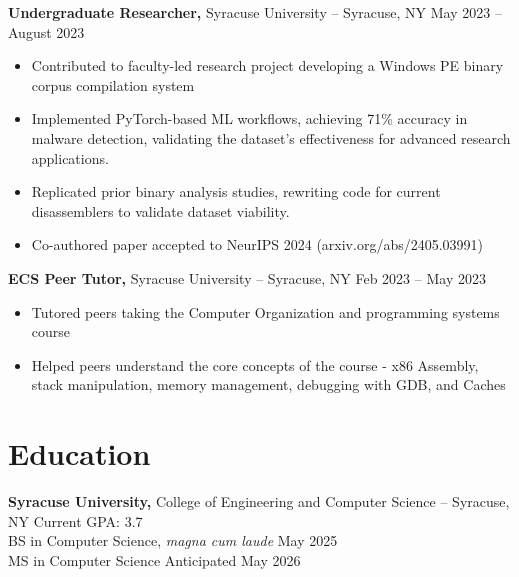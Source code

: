 \vspace{-6pt}
\textbf{Undergraduate Researcher,} {Syracuse University} -- Syracuse, NY \hfill May 2023 -- August 2023 \\
\vspace{-9pt}
\begin{itemize}
	\item Contributed to faculty-led research project developing a Windows PE binary corpus compilation system
	\item Implemented PyTorch-based ML workflows, achieving 71\% accuracy in malware detection, validating the dataset's effectiveness for advanced research applications.
	\item Replicated prior binary analysis studies, rewriting code for current disassemblers to validate dataset viability.
	\item Co-authored paper accepted to NeurIPS 2024 (arxiv.org/abs/2405.03991)
\end{itemize}
\vspace{-6pt}
\textbf{ECS Peer Tutor,} {Syracuse University} -- Syracuse, NY \hfill Feb 2023 -- May 2023 \\
\vspace{-9pt}
\begin{itemize}
	\item Tutored peers taking the Computer Organization and programming systems course
	\item Helped peers understand the core concepts of the course - x86 Assembly, stack manipulation, memory management, debugging with GDB, and Caches
\end{itemize}

\vspace{-25pt}


\section*{Education}
\textbf{Syracuse University, } {College of Engineering and Computer Science} -- Syracuse, NY \hfill Current GPA: 3.7 \\
\hspace{2em}BS in Computer Science, \textit{magna cum laude} \hfill May 2025 \\
\hspace{2em}MS in Computer Science \hfill Anticipated May 2026 \\

\vspace{-20pt}
